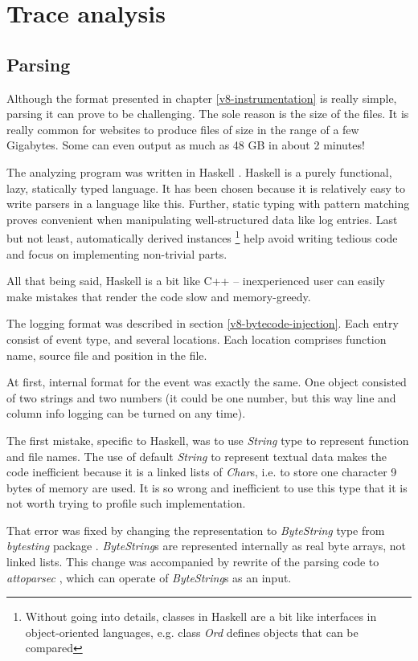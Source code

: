\chapter{Trace analysis}

\section{Parsing}
Although the format presented in chapter \ref{v8-instrumentation} is really simple, parsing it can prove to be challenging.
The sole reason is the size of the files. It is really common for websites to produce files of size in the range of a few Gigabytes.
Some can even output as much as 48 GB in about 2 minutes!

The analyzing program was written in Haskell \cite{haskell:main-page}.
Haskell is a purely functional, lazy, statically typed language.
It has been chosen because it is relatively easy to write parsers in a language like this.
Further, static typing with pattern matching proves convenient when manipulating well-structured data like log entries.
Last but not least, automatically derived instances
\footnote{Without going into details, classes in Haskell are a bit like interfaces in 
object-oriented languages, e.g. class \emph{Ord} defines objects that can be compared}
help avoid writing tedious code and focus on implementing non-trivial parts.

All that being said, Haskell is a bit like C++ -- inexperienced user can easily make mistakes
that render the code slow and memory-greedy.

The logging format was described in section \ref{v8-bytecode-injection}.
Each entry consist of event type, and several locations. Each location comprises
function name, source file and position in the file.

At first, internal format for the event was exactly the same. One object consisted of
two strings and two numbers (it could be one number, but this way line and column info
logging can be turned on any time).

The first mistake, specific to Haskell, was to use \emph{String} type to represent function and file
names. The use of default \emph{String} to represent textual data makes the code inefficient 
because it is a linked lists of \emph{Char}s, i.e. to store one character 9 bytes of memory are used.
It is so wrong and inefficient to use this type that it is not worth trying to profile such implementation.

That error was fixed by changing the representation to \emph{ByteString} type from \emph{bytesting} 
package \cite{haskell:bytestring}. \emph{ByteString}s are represented internally as real byte arrays,
not linked lists. 
This change was accompanied by rewrite of the parsing code to \emph{attoparsec} \cite{haskell:attoparsec},
which can operate of \emph{ByteString}s as an input.

